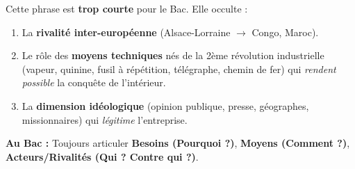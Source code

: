 \documentclass[11pt]{article}
\begin{document}
\begin{attention}
Cette phrase est \textbf{trop courte} pour le Bac. Elle occulte :
\begin{enumerate}
    \item La \textbf{rivalité inter-européenne} (Alsace-Lorraine $\rightarrow$ Congo, Maroc).
    \item Le rôle des \textbf{moyens techniques} nés de la 2ème révolution industrielle (vapeur, quinine, fusil à répétition, télégraphe, chemin de fer) qui \emph{rendent possible} la conquête de l'intérieur.
    \item La \textbf{dimension idéologique} (opinion publique, presse, géographes, missionnaires) qui \emph{légitime} l'entreprise.
\end{enumerate}
\textbf{Au Bac :} Toujours articuler \textbf{Besoins (Pourquoi ?)}, \textbf{Moyens (Comment ?)}, \textbf{Acteurs/Rivalités (Qui ? Contre qui ?)}.
\end{attention}
\end{document}
